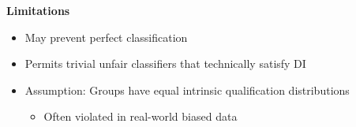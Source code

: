 \documentclass[7.5pt,a4paper, landscape]{article}
\begin{document}
\begin{multicols*}{4}
{\begin{minipage}[t]{\linewidth}
\textbf{Limitations}
\begin{itemize}
    \item May prevent perfect classification
    \item Permits trivial unfair classifiers that technically satisfy DI
    \item Assumption: Groups have equal intrinsic qualification distributions
    \begin{itemize}
        \item Often violated in real-world biased data
    \end{itemize}
\end{itemize}
\end{minipage}}




\end{multicols*}
\end{document}
